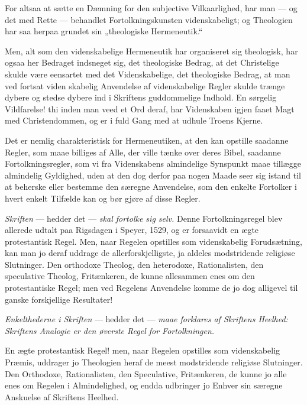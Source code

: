 \documentclass[12pt,a4paper]{book}
\newcommand{\opage}[1]{\marginnote{\footnotesize\textit{[#1]}}}
\begin{document}
For altsaa at sætte en Dæmning for den subjective Vilkaarlighed, har man
--- og det med Rette --- behandlet Fortolkningskunsten videnskabeligt; og
Theologien har saa herpaa grundet sin „theologiske Hermeneutik.“

Men, alt som den videnskabelige Hermeneutik har organiseret sig
theologisk, har ogsaa her Bedraget indsneget sig, det theologiske Bedrag,
at det Christelige skulde være eensartet med det Videnskabelige, det
theologiske Bedrag, at man ved fortsat viden\-%
\opage{55}skabelig Anvendelse af videnskabelige Regler skulde trænge dybere og
stedse dybere ind i Skriftens guddommelige Indhold. En sørgelig
Vildfarelse! thi inden man veed et Ord deraf, har Videnskaben igjen faaet
Magt med Christendommen, og er i fuld Gang med at udhule Troens Kjerne.

Det er nemlig charakteristisk for Hermeneutiken, at den kan opstille
saadanne Regler, som maae billiges af Alle, der ville tænke over deres
Bibel, saadanne Fortolkningsregler, som vi fra Videnskabens almindelige
Synspunkt maae tillægge almindelig Gyldighed, uden at den dog derfor paa
nogen Maade seer sig istand til at beherske eller bestemme den særegne
Anvendelse, som den enkelte Fortolker i hvert enkelt Tilfælde kan og bør
gjøre af disse Regler.

\emph{Skriften} --- hedder det --- \emph{skal fortolke sig selv.} Denne
Fortolkningsregel blev allerede udtalt paa Rigsdagen i Speyer, 1529, og
er forsaavidt en ægte protestantisk Regel. Men, naar Regelen opstilles
som videnskabelig Forudsætning, kan man jo deraf uddrage de
allerforskjelligste, ja aldeles modstridende religiøse Slutninger. Den
orthodoxe Theolog, den heterodoxe, Rationalisten, den speculative
Theolog, Fritænkeren, de kunne allesammen enes om den protestantiske
Regel; men ved Regelens Anvendelse komme de jo dog alligevel til ganske
forskjellige Resultater!

\emph{Enkelthederne i Skriften} --- hedder det --- \emph{maae forklares
af Skriftens Heelhed: Skriftens Analogie er den øverste Regel for
Fortolkningen.}

En ægte protestantisk Regel! men, naar Regelen opstilles som
videnskabelig Præmis, uddrager jo Theologien heraf de meest modstridende
religiøse Slutninger. Den Orthodoxe, Rationalisten, den Speculative,
Fritænkeren, de kunne jo alle enes om Regelen i Almindelighed, og endda
udbringer jo Enhver sin særegne Anskuelse af Skriftens Heelhed.
\end{document}
